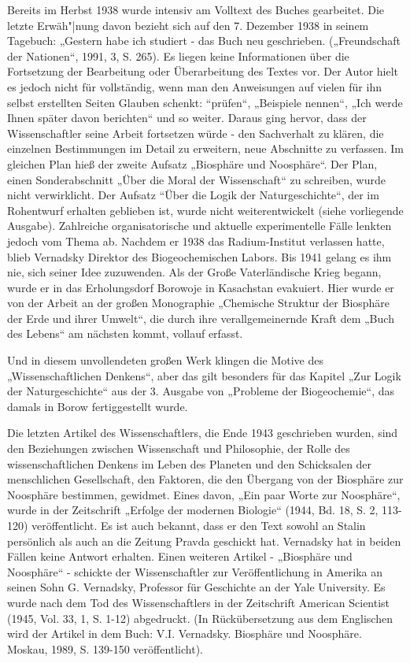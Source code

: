 \documentclass[11pt,a4paper]{article}
\begin{document}
Bereits im Herbst 1938 wurde intensiv am Volltext des Buches gearbeitet. Die
letzte Erwäh"|nung davon bezieht sich auf den 7. Dezember 1938 in seinem
Tagebuch: „Gestern habe ich studiert - das Buch neu geschrieben.
(„Freundschaft der Nationen“, 1991, 3, S. 265). Es liegen keine Informationen
über die Fortsetzung der Bearbeitung oder Überarbeitung des Textes vor. Der
Autor hielt es jedoch nicht für vollständig, wenn man den Anweisungen auf
vielen für ihn selbst erstellten Seiten Glauben schenkt: “prüfen“, „Beispiele
nennen“, „Ich werde Ihnen später davon berichten“ und so weiter. Daraus ging
hervor, dass der Wissenschaftler seine Arbeit fortsetzen würde - den
Sachverhalt zu klären, die einzelnen Bestimmungen im Detail zu erweitern, neue
Abschnitte zu verfassen. Im gleichen Plan hieß der zweite Aufsatz „Biosphäre
und Noosphäre“. Der Plan, einen Sonderabschnitt „Über die Moral der
Wissenschaft“ zu schreiben, wurde nicht verwirklicht. Der Aufsatz “Über die
Logik der Naturgeschichte“, der im Rohentwurf erhalten geblieben ist, wurde
nicht weiterentwickelt (siehe vorliegende Ausgabe). Zahlreiche
organisatorische und aktuelle experimentelle Fälle lenkten jedoch vom Thema
ab. Nachdem er 1938 das Radium-Institut verlassen hatte, blieb Vernadsky
Direktor des Biogeochemischen Labors. Bis 1941 gelang es ihm nie, sich seiner
Idee zuzuwenden. Als der Große Vaterländische Krieg begann, wurde er in das
Erholungsdorf Borowoje in Kasachstan evakuiert. Hier wurde er von der Arbeit
an der großen Monographie „Chemische Struktur der Biosphäre der Erde und ihrer
Umwelt“, die durch ihre verallgemeinernde Kraft dem „Buch des Lebens“ am
nächsten kommt, vollauf erfasst.

Und in diesem unvollendeten großen Werk klingen die Motive des
„Wissenschaftlichen Denkens“, aber das gilt besonders für das Kapitel „Zur
Logik der Naturgeschichte“ aus der 3. Ausgabe von „Probleme der Biogeochemie“,
das damals in Borow fertiggestellt wurde.

Die letzten Artikel des Wissenschaftlers, die Ende 1943 geschrieben wurden,
sind den Beziehungen zwischen Wissenschaft und Philosophie, der Rolle des
wissenschaftlichen Denkens im Leben des Planeten und den Schicksalen der
menschlichen Gesellschaft, den Faktoren, die den Übergang von der Biosphäre
zur Noosphäre bestimmen, gewidmet. Eines davon, „Ein paar Worte zur
Noosphäre“, wurde in der Zeitschrift „Erfolge der modernen Biologie“ (1944,
Bd. 18, S. 2, 113-120) veröffentlicht. Es ist auch bekannt, dass er den Text
sowohl an Stalin persönlich als auch an die Zeitung Pravda geschickt hat.
Vernadsky hat in beiden Fällen keine Antwort erhalten. Einen weiteren Artikel
- „Biosphäre und Noosphäre“ - schickte der Wissenschaftler zur
Veröffentlichung in Amerika an seinen Sohn G. Vernadsky, Professor für
Geschichte an der Yale University. Es wurde nach dem Tod des Wissenschaftlers
in der Zeitschrift American Scientist (1945, Vol. 33, 1, S. 1-12) abgedruckt.
(In Rückübersetzung aus dem Englischen wird der Artikel in dem Buch:
V.I. Vernadsky. Biosphäre und Noosphäre. Moskau, 1989, S. 139-150
veröffentlicht).
\end{document}
